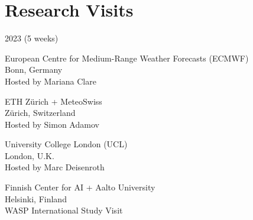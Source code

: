 \section*{Research Visits}
\newcommand{\rvisit}[5]{%
    \item [#2 (#3)] #1\\
        {\footnotesize#4}\\%
        #5
}
\begin{labeling}{2023 (5 weeks)}
    \rvisit{European Centre for Medium-Range Weather Forecasts (ECMWF)}{2024}{1 week}{Bonn, Germany}{Hosted by Mariana Clare}
    \rvisit{ETH Zürich + MeteoSwiss}{2024}{1 week}{Zürich, Switzerland}{Hosted by Simon Adamov}
    \rvisit{University College London (UCL)}{2023}{5 weeks}{London, U.K.}{Hosted by Marc Deisenroth}
    \rvisit{Finnish Center for AI + Aalto University}{2022}{1 week}{Helsinki, Finland}{WASP International Study Visit}
\end{labeling}

